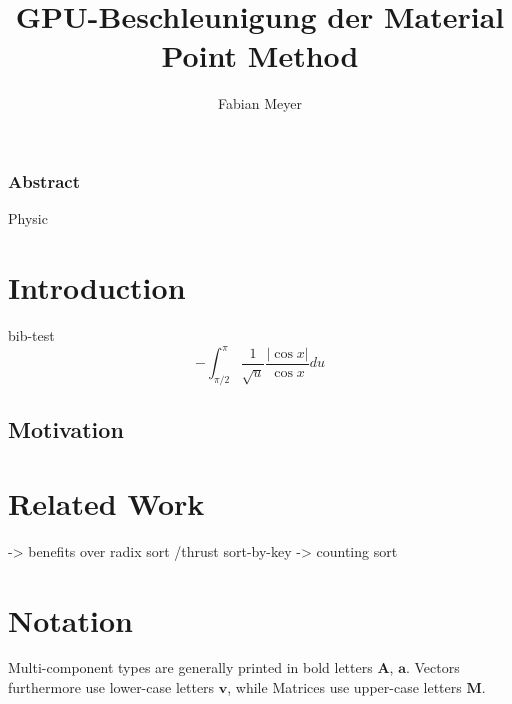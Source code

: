 \documentclass[m,times]{cgMA}
\begin{document}
\author{Fabian Meyer}
\title{GPU-Beschleunigung der Material Point Method}


\maketitle

\clearpage
{}
\subsubsection*{Abstract}

\noindent Physic


\clearpage
\tableofcontents

\clearpage         %
{}


\section{Introduction} \label{intro}
bib-test \cite{MPM:SNOW}
$$ -  \int_{\pi/2}^{\pi} \frac{1}{\sqrt{u}} \frac{\lvert \cos{x} \rvert}{\cos{x}} du $$
\subsection{Motivation}
\section{Related Work}
\cite{PIC:GPU} -> \cite{NVIDIA:NNSEARCH}
benefits over radix sort /thrust sort-by-key -> counting sort
\cite{NVIDIA:SHUFFLE}

\cite{MPM:GPU}
\section{Notation}
Multi-component types are generally printed in bold letters $\mathbf{A}$, $\mathbf{a}$. Vectors furthermore use lower-case letters $\mathbf{v}$, while Matrices use upper-case letters $\mathbf{M}$.
\end{document}
